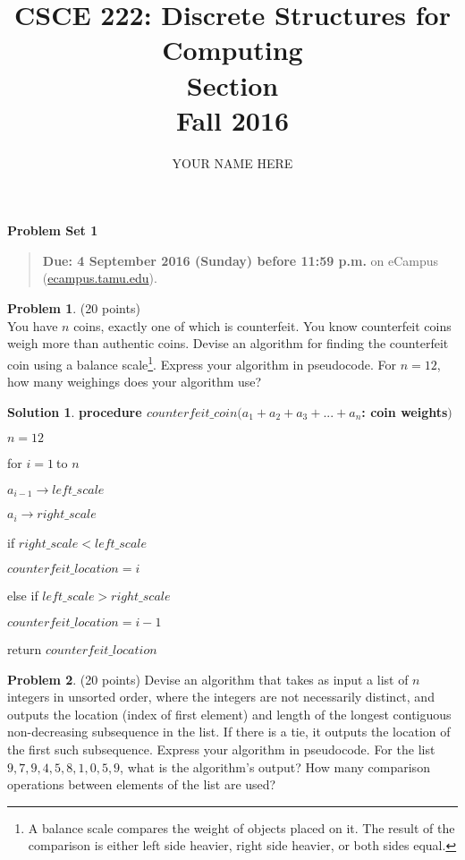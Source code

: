 \documentclass{article}
\title{CSCE 222: Discrete Structures for Computing\\Section \mysectionnumber\\Fall 2016}
\author{YOUR NAME HERE}
\theoremstyle{definition}
\newtheorem{problem}{Problem}
\newtheorem*{solution}{Solution}
\newcommand{\problemset}[1]{\begin{center}\textbf{Problem Set #1}\end{center}}
\newcommand{\duedate}[1]{\begin{quote}\textbf{Due: #1} on eCampus (\url{ecampus.tamu.edu}).\end{quote}}
\begin{document}
\maketitle

\problemset{1}

\duedate{4 September 2016 (Sunday) before 11:59 p.m.}

\bigskip

\begin{problem} (20 points)\\
You have $n$ coins, exactly one of which is counterfeit.  You know counterfeit coins weigh more than authentic coins.  Devise an algorithm for finding the counterfeit coin using a balance scale\footnote{A balance scale compares the weight of objects placed on it.  The result of the comparison is either left side heavier, right side heavier, or both sides equal.}.  Express your algorithm in pseudocode.  For $n=12$, how many weighings does your algorithm use?
\end{problem}

\begin{solution}

\item \bf procedure $counterfeit\_coin(a_{1}+a_{2}+a_{3}+...+a_{n}$: coin weights$)$

$n=12$

for $i=1\ $to $n$

\qquad $a_{i-1}\rightarrow left\_scale$

\qquad $a_{i}\rightarrow right\_scale$

\qquad if $right\_scale<left\_scale$

\qquad \qquad $counterfeit\_location=i$

\qquad else if $left\_scale>right\_scale$

\qquad \qquad $counterfeit\_location=i-1$

return $counterfeit\_location$

\end{solution}

\newpage

\begin{problem}
(20 points)\newline
Devise an algorithm that takes as input a list of $n$ integers in unsorted
order, where the integers are not necessarily distinct, and outputs the
location (index of first element) and length of the longest contiguous
non-decreasing subsequence in the list. If there is a tie, it outputs the
location of the first such subsequence. Express your algorithm in
pseudocode. For the list $9,7,9,4,5,8,1,0,5,9$, what is the algorithm's
output? How many comparison operations between elements of the list are used?
\end{problem}
\end{document}
